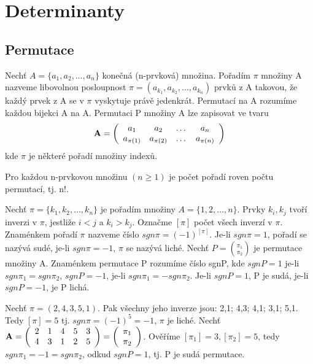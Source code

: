 \section{Determinanty}

\subsection{Permutace}
\begin{definition}
Nechť $A = \{a_1,a_2, \dots, a_n\}$ konečná (n-prvková) množina. Pořadím $\pi$ množiny A nazveme libovolnou posloupnost $\pi = (a_{k_1},a_{k_2}, \dots, a_{k_n})$ prvků z A takovou, že každý prvek z A se v $\pi$ vyskytuje právě jedenkrát. Permutací na A rozumíme každou bijekci A na A. Permutaci P množiny A lze zapisovat ve tvaru
\begin{displaymath}
{\bf A} =
\left( \begin{array}{cccc}
a_{1} & a_{2} & \dots & a_{n} \\
a_{\pi (1)} & a_{\pi (2)} & \dots & a_{\pi (n)} \\

\end{array} \right)
\end{displaymath}
kde $\pi$ je některé pořadí množiny indexů.
\end{definition}

\begin{definition}
	Pro každou n-prvkovou množinu $(n \geq 1)$ je počet pořadí roven počtu permutací, tj. n!.
\end{definition}


\begin{definition}
	Nechť $\pi = \{k_1,k_2, \dots, k_n\}$ je pořadím množiny $A = \{ 1,2,\dots, n\}$. Prvky $k_i,k_j$ tvoří inverzi v $\pi$, jestliže $i < j$ a  $k_i > k_j$. Označme $[\pi]$ počet všech inverzí v $\pi$. Znaménkem pořadí $\pi$ nazveme číslo $sgn\pi = (-1)^{[\pi]}$. Je-li $sgn\pi = 1$, pořadí se nazývá sudé, je-li $sgn\pi = -1$,  $\pi$ se nazývá liché. Nechť $P = { \pi_1 \choose \pi_2}$ je permutace množiny A. Znaménkem permutace P rozumíme číslo sgnP, kde $sgnP = 1$ je-li $sgn\pi_1 = sgn\pi_2$, $sgnP = -1$, je-li $sgn\pi_1 = - sgn\pi_2$. Je-li $sgnP = 1$, P je sudá, je-li $sgnP = -1$, je P lichá.
\end{definition}

\begin{example}
	Nechť $\pi = (2,4,3,5,1)$. Pak všechny jeho inverze jsou: 2,1; 4,3; 4,1; 3,1; 5,1. Tedy $[\pi] = 5$ tj. $sgn\pi = (-1)^5 = -1$, $\pi$ je liché.
	Nechť ${\bf A} =
\left( \begin{array}{ccccc}
2 & 1 & 4 & 5 & 3 \\
4 & 3 & 1 & 2 & 5 \\
\end{array} \right) = \left( \begin{array}{c}
\pi_1 \\
\pi_2 \\
\end{array} \right) $. Ověříme $[\pi_1] = 3, [\pi_2] = 5$, tedy $sgn\pi_1 = -1 = sgn\pi_2$, odkud $sgnP = 1$, tj. P je sudá permutace.
\end{example}

